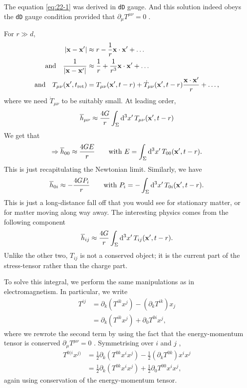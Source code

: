 The equation \eqref{eq:22-1} was derived in \texttt{dD} gauge. And this solution indeed obeys the \texttt{dD} gauge condition provided that $\partial_{\mu} T^{\mu\nu} = 0$ .

For $r \gg d$, 
\begin{align}
  \abs{\vb{x} - \vb{x}'} &\approx r - \frac{1}{r} \vb{x} \cdot \vb{x}' + \dots \\
  \text{and} \quad \frac{1}{\abs{\vb{x} - \vb{x}'}} &\approx \frac{1}{r} + \frac{1}{r^3} \vb{x} \cdot \vb{x}' + \dots \\
  \text{and} \quad T_{\mu\nu} ( \vb{x}', t_{\text{ret}}) &= T_{\mu\nu} (\vb{x}', t - r) + \dot{T}_{\mu\nu} ( \vb{x}' , t - r) \frac{\vb{x} \cdot \vb{x}'}{r} + \dots,
\end{align} 
where we need $\dot{T}_{\mu\nu}$  to be suitably small.
At leading order, 
\begin{equation}
  \overline{h}_{\mu\nu} \approx \frac{4 G}{r} \int_{\Sigma} \dd[3]{x'} T_{\mu\nu}(\vb{x}', t - r)
\end{equation}
We get that
\begin{equation}
  \Rightarrow \overline{h}_{00} \approx \frac{4GE}{r} \qquad \text{with } E = \int_{\Sigma} \dd[3]{x'} T_{00} (\vb{x}', t - r).
\end{equation}
This is just recapitulating the Newtonian limit.
Similarly, we have
\begin{equation}
  \overline{h}_{0i} \approx - \frac{4GP_i}{r} \qquad \text{with } P_i = -\int_{\Sigma} \dd[3]{x'} T_{0i} (\vb{x}', t - r).
\end{equation}
This is just a long-distance fall off that you would see for stationary matter, or for matter moving along way away. 
The interesting physics comes from the following component
\begin{equation}
  \overline{h}_{ij} \approx \frac{4G}{r} \int_{\Sigma} \dd[3]{x'} T_{ij}(\vb{x}', t - r).
\end{equation}
Unlike the other two, $T_{ij}$  is not a conserved object; it is the current part of the stress-tensor rather than the charge part.

To solve this integral, we perform the same manipulations as in electromagnetism. In particular, we write
\begin{align}
  T^{ij} &= \partial_{k} (T^{ik} x^{j}) - (\partial_{k} T^{ik})x_{j} \\
	 &= \partial_{k} (T^{ik} x^{j}) + \partial_0 T^{0i} x^{j},
\end{align}
where we rewrote the second term by using the fact that the energy-momentum tensor is conserved $\partial_{\mu} T^{\mu\nu} = 0$ .
Symmetrising over $i$  and $j$ , 
\begin{align}
  T^{0(i} x^{j)} &= \frac{1}{2}\partial_{k} ( T^{0k} x^{i} x^{j}) - \frac{1}{2} (\partial_{k} T^{0k}) x^{i} x^{j} \\
  &= \frac{1}{2}\partial_{k} (T^{0k} x^{i} x^{j}) + \frac{1}{2} \partial_0 T^{00} x^{i} x^{j},
\end{align}
again using conservation of the energy-momentum tensor.

